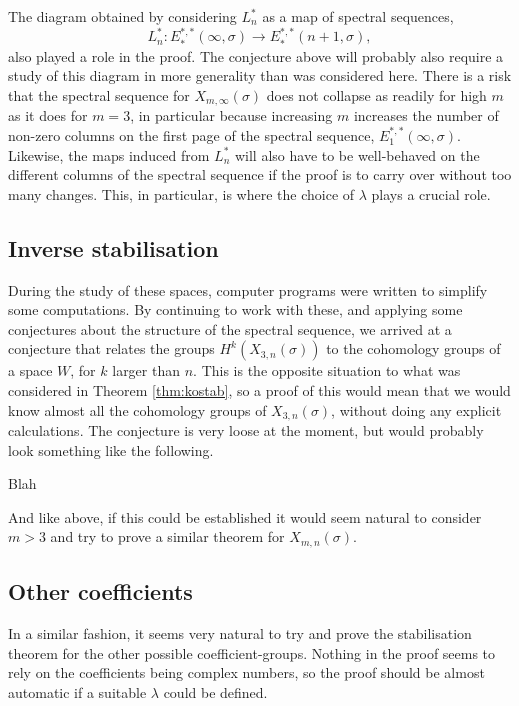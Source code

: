The diagram obtained by considering $L_n^*$ as a map of spectral
sequences,
\[ L_n^* : E_*^{*,*}(\infty,\sigma) \to E_*^{*,*}(n+1,\sigma), \]
also played a role in the proof. The conjecture above will probably
also require a study of this diagram in more generality than was
considered here. There is a risk that the spectral sequence for
$X_{m,\infty}(\sigma)$ does not collapse as readily for high $m$ as it
does for $m=3$, in particular because increasing $m$ increases the
number of non-zero columns on the first page of the spectral sequence,
$E_1^{*,*}(\infty,\sigma)$. Likewise, the maps induced from $L_n^*$
will also have to be well-behaved on the different columns of the
spectral sequence if the proof is to carry over without too many
changes. This, in particular, is where the choice of $\lambda$ plays
a crucial role.

\subsection{Inverse stabilisation}

During the study of these spaces, computer programs were written
to simplify some computations. By continuing to work with these, and
applying some conjectures about the structure of the spectral
sequence, we arrived at a conjecture that relates the groups
$H^k(X_{3,n}(\sigma))$ to the cohomology groups of a space $W$, for
$k$ larger
than $n$. This is the opposite situation to what was considered in
Theorem \ref{thm:kostab}, so a proof of this would mean that we
would know almost all the cohomology groups of $X_{3,n}(\sigma)$,
without doing any explicit calculations. The conjecture is very loose
at the moment, but would probably look something like the following.
\begin{conjecture}
  Blah 
\end{conjecture}

And like above, if this could be established it would seem natural to
consider $m > 3$ and try to prove a similar theorem for
$X_{m,n}(\sigma)$.

\subsection{Other coefficients}

In a similar fashion, it seems very natural to try and prove the
stabilisation theorem for the other possible
coefficient-groups. Nothing in the proof seems to rely on the
coefficients being complex numbers, so the proof should be almost
automatic if a suitable $\lambda$ could be defined.

